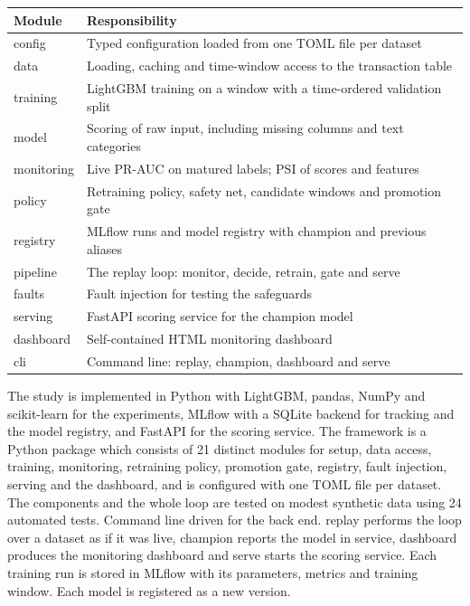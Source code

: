 \documentclass[11pt,letterpaper]{report}
\begin{document}
{\small
\begin{longtable}{|>{\raggedright\arraybackslash}p{}|>{\raggedright\arraybackslash}p{}|}
\hline
Module & Responsibility \\ \hline
config & Typed configuration loaded from one TOML file per dataset \\ \hline
data & Loading, caching and time-window access to the transaction table \\ \hline
training & LightGBM training on a window with a time-ordered validation split \\ \hline
model & Scoring of raw input, including missing columns and text categories \\ \hline
monitoring & Live PR-AUC on matured labels; PSI of scores and features \\ \hline
policy & Retraining policy, safety net, candidate windows and promotion gate \\ \hline
registry & MLflow runs and model registry with champion and previous aliases \\ \hline
pipeline & The replay loop: monitor, decide, retrain, gate and serve \\ \hline
faults & Fault injection for testing the safeguards \\ \hline
serving & FastAPI scoring service for the champion model \\ \hline
dashboard & Self-contained HTML monitoring dashboard \\ \hline
cli & Command line: replay, champion, dashboard and serve \\ \hline
\end{longtable}
}

The study is implemented in Python with LightGBM, pandas, NumPy and scikit-learn for the experiments, MLflow with a SQLite backend for tracking and the model registry, and FastAPI for the scoring service. The framework is a Python package which consists of 21 distinct modules for setup, data access, training, monitoring, retraining policy, promotion gate, registry, fault injection, serving and the dashboard, and is configured with one TOML file per dataset. The components and the whole loop are tested on modest synthetic data using 24 automated tests. Command line driven for the back end. replay performs the loop over a dataset as if it was live, champion reports the model in service, dashboard produces the monitoring dashboard and serve starts the scoring service. Each training run is stored in MLflow with its parameters, metrics and training window. Each model is registered as a new version.
\end{document}

